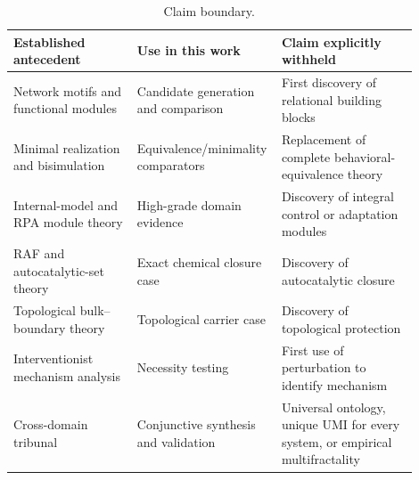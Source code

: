 \begin{table}[htbp]
\centering
\small
\caption{Claim boundary.}
\label{tab:claim-boundary}
\begin{tabular}{p{0.30\linewidth}p{0.27\linewidth}p{0.33\linewidth}}
\toprule
Established antecedent & Use in this work & Claim explicitly withheld \\
\midrule
Network motifs and functional modules & Candidate generation and comparison & First discovery of relational building blocks \\
Minimal realization and bisimulation & Equivalence/minimality comparators & Replacement of complete behavioral-equivalence theory \\
Internal-model and RPA module theory & High-grade domain evidence & Discovery of integral control or adaptation modules \\
RAF and autocatalytic-set theory & Exact chemical closure case & Discovery of autocatalytic closure \\
Topological bulk--boundary theory & Topological carrier case & Discovery of topological protection \\
Interventionist mechanism analysis & Necessity testing & First use of perturbation to identify mechanism \\
Cross-domain tribunal & Conjunctive synthesis and validation & Universal ontology, unique UMI for every system, or empirical multifractality \\
\bottomrule
\end{tabular}
\end{table}
